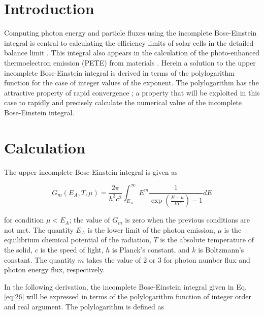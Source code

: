 \documentclass[letterpaper,12pt]{article}
\title{\Title}
\author{\AuthorName}
\begin{document}
\maketitle


\begin{abstract}
The upper incomplete Bose-Einstein integral is expressed in terms of a finite sum of polylogarithm functions.
\end{abstract}


\section{Introduction}
Computing photon energy and particle fluxes using the incomplete Bose-Einstein integral is central to calculating the efficiency limits of solar cells in the detailed balance limit \cite{10.1063/1.1736034}. This integral also appears in the calculation of the photo-enhanced thermoelectron emission (PETE) from materials \cite{10.1038/nmat2814}. Herein a solution to the upper incomplete Bose-Einstein integral is derived in terms of the polylogarithm function for the case of integer values of the exponent. The polylogarithm has the attractive property of rapid convergence \cite{http://academic.reed.edu/physics/faculty/crandall/papers/Polylog}; a property that will be exploited in this case to rapidly and precisely calculate the numerical value of the incomplete Bose-Einstein integral.


\section{Calculation}
The upper incomplete Bose-Einstein integral is given as

\begin{equation} \label{eq:54}
G_{m}(E_{A},T,\mu) = \frac{2 \pi}{h^{3}c^{2}} \int_{E_{A}}^{\infty} E^{m} \frac{1}{\exp \left( \frac{E - \mu}{kT} \right) - 1} dE 
\end{equation}

\noindent for condition $\mu < E_{A}$; the value of $G_{m}$ is zero when the previous conditions are not met. The quantity $E_{A}$ is the lower limit of the photon emission, $\mu$ is the equilibrium chemical potential of the radiation, $T$ is the absolute temperature of the solid, $c$ is the speed of light, $h$ is Planck's constant, and $k$ is Boltzmann's constant. The quantity $m$ takes the value of 2 or 3 for photon number flux and photon energy flux, respectively.

In the following derivation, the incomplete Bose-Einstein integral given in Eq. \ref{eq:26} will be expressed in terms of the polylogarithm function of integer order and real argument. The polylogarithm is defined as
\end{document}
